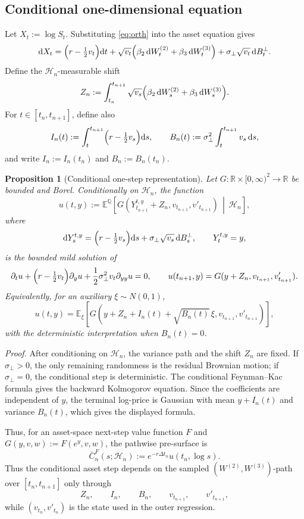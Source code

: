 \documentclass[pdflatex,sn-mathphys-num]{sn-jnl}
\theoremstyle{thmstyleone}%
\newtheorem{proposition}[theorem]{Proposition}
\theoremstyle{thmstylethree}%
\theoremstyle{thmstyletwo}%
\newcommand{\dd}{\mathrm d}
\newcommand{\E}{\mathbb E}
\newcommand{\Q}{\mathbb Q}
\newcommand{\R}{\mathbb R}
\begin{document}
\subsection{Conditional one-dimensional equation}

Let $X_t:=\log S_t$. Substituting \eqref{eq:orth} into the asset equation gives
$$
\dd X_t
=\Bigl(r-\tfrac12v_t\Bigr)\dd t
+\sqrt{v_t}\Bigl(\beta_2\,\dd W_t^{(2)}
+\beta_3\,\dd W_t^{(3)}\Bigr)
+\sigma_\perp\sqrt{v_t}\,\dd B_t^\perp .
$$
Define the $\mathcal H_n$-measurable shift
$$
Z_n:=
\int_{t_n}^{t_{n+1}}
\sqrt{v_s}\Bigl(\beta_2\,\dd W_s^{(2)}+
\beta_3\,\dd W_s^{(3)}\Bigr).
$$
For $t\in[t_n,t_{n+1}]$, define also
$$
I_n(t):=\int_t^{t_{n+1}}\Bigl(r-\tfrac12v_s\Bigr)\dd s,
\qquad
B_n(t):=\sigma_\perp^2\int_t^{t_{n+1}}v_s\,\dd s,
$$
and write $I_n:=I_n(t_n)$ and $B_n:=B_n(t_n)$.

\begin{proposition}[Conditional one-step representation]\label{prop:conditional-gaussian-step}
Let $G:\R\times[0,\infty)^2\to\R$ be bounded and Borel. Conditionally on
$\mathcal H_n$, the function
$$
u(t,y)
:=
\E^\Q\!\left[
G\!\left(
Y_{t_{n+1}}^{t,y}+Z_n,
v_{t_{n+1}},
v'_{t_{n+1}}
\right)
\,\middle|\,
\mathcal H_n
\right],
$$
where
$$
\dd Y_s^{t,y}
=\Bigl(r-\tfrac12v_s\Bigr)\dd s
+\sigma_\perp\sqrt{v_s}\,\dd B_s^\perp,
\qquad
Y_t^{t,y}=y,
$$
is the bounded mild solution of
$$
\partial_tu+
\Bigl(r-\tfrac12v_t\Bigr)\partial_yu+
\frac12\sigma_\perp^2v_t\partial_{yy}u=0,
\qquad
u(t_{n+1},y)=G(y+Z_n,v_{t_{n+1}},v'_{t_{n+1}}).
$$
Equivalently, for an auxiliary $\xi\sim N(0,1)$,
$$
u(t,y)
=
\E_\xi\!\left[
G\!\left(
y+Z_n+I_n(t)+\sqrt{B_n(t)}\,\xi,
v_{t_{n+1}},
v'_{t_{n+1}}
\right)
\right],
$$
with the deterministic interpretation when $B_n(t)=0$.
\end{proposition}

\noindent\textit{Proof.} After conditioning on $\mathcal H_n$, the variance
path and the shift $Z_n$ are fixed. If $\sigma_\perp>0$, the only remaining
randomness is the residual Brownian motion; if $\sigma_\perp=0$, the
conditional step is deterministic. The conditional
Feynman--Kac formula gives the backward Kolmogorov equation. Since the
coefficients are independent of $y$, the terminal log-price is Gaussian with
mean $y+I_n(t)$ and variance $B_n(t)$, which gives the displayed formula.

Thus, for an asset-space next-step value function $F$ and
$G(y,v,w):=F(e^y,v,w)$, the pathwise pre-surface is
$$
\bar C_n^F(s;\mathcal H_n):=e^{-r\Delta t_n}u(t_n,\log s).
$$
Thus the conditional asset step depends on the sampled
$(W^{(2)},W^{(3)})$-path over $[t_n,t_{n+1}]$ only through
$$
Z_n,\qquad I_n,\qquad B_n,\qquad v_{t_{n+1}},\qquad v'_{t_{n+1}},
$$
while $(v_{t_n},v'_{t_n})$ is the state used in the outer regression.
\end{document}
